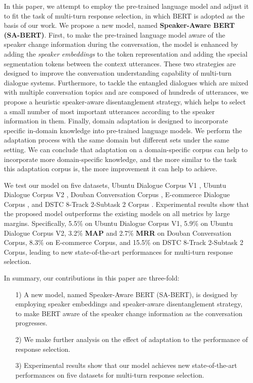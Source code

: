 \documentclass[sigconf]{acmart}
\begin{document}
  In this paper, we attempt to employ the pre-trained language model and adjust it to fit the task of multi-turn response selection, in which BERT \cite{DBLP:conf/naacl/DevlinCLT19} is adopted as the basis of our work.
  We propose a new model, named \textbf{Speaker-Aware BERT (SA-BERT)}.
  First, to make the pre-trained language model aware of the speaker change information during the conversation, the model is enhanced by adding the \emph{speaker embeddings} to the token representation and adding the special segmentation tokens between the context utterances.
  These two strategies are designed to improve the conversation understanding capability of multi-turn dialogue systems.
  Furthermore, to tackle the entangled dialogues which are mixed with multiple conversation topics and are composed of hundreds of utterances, we propose a heuristic speaker-aware disentanglement strategy, which helps to select a small number of most important utterances according to the speaker information in them.
  Finally, domain adaptation is designed to incorporate specific in-domain knowledge into pre-trained language models.
  We perform the adaptation process with the same domain but different sets under the same setting.
  We can conclude that adaptation on a domain-specific corpus can help to incorporate more domain-specific knowledge, and the more similar to the task this adaptation corpus is, the more improvement it can help to achieve.

  We test our model on five datasets, Ubuntu Dialogue Corpus V1 \cite{DBLP:conf/sigdial/LowePSP15}, Ubuntu Dialogue Corpus V2 \cite{DBLP:journals/dad/LowePSCLP17}, Douban Conversation Corpus \cite{DBLP:conf/acl/WuWXZL17}, E-commerce Dialogue Corpus \cite{DBLP:conf/coling/ZhangLZZL18}, and DSTC 8-Track 2-Subtask 2 Corpus \cite{DBLP:journals/corr/abs-1911-06394}.
  Experimental results show that the proposed model outperforms the existing models on all metrics by large margins.
  Specifically,
    5.5\%  on Ubuntu Dialogue Corpus V1,
    5.9\%  on Ubuntu Dialogue Corpus V2,
    3.2\% \textbf{MAP} and 2.7\% \textbf{MRR} on Douban Conversation Corpus,
    8.3\%  on E-commerce Corpus,
    and 15.5\%  on DSTC 8-Track 2-Subtask 2 Corpus,
  leading to new state-of-the-art performances for multi-turn response selection.

  In summary, our contributions in this paper are three-fold:
  \begin{itemize}
    \item [1)]
    A new model, named Speaker-Aware BERT (SA-BERT), is designed by employing speaker embeddings and speaker-aware disentanglement strategy, to make BERT aware of the speaker change information as the conversation progresses.
    \item [2)]
    We make further analysis on the effect of adaptation to the performance of response selection.
    \item [3)]
    Experimental results show that our model achieves new state-of-the-art performances on five datasets for multi-turn response selection.
  \end{itemize}
\end{document}
